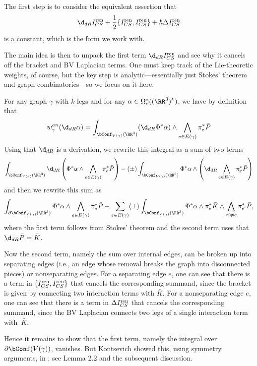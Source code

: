 \documentclass[10pt]{amsart}
\begin{document}
The first step is to consider the equivalent assertion that
\[
\d_{dR} I^{\rm ren}_{CS} + \frac{1}{2} \{I^{\rm ren}_{CS},I^{\rm ren}_{CS}\} + \hbar \Delta I^{\rm ren}_{CS} 
\]
is a constant,
which is the form we work with.

The main idea is then to unpack the first term $\d_{dR} I^{\rm ren}_{CS}$ and see why it cancels off the bracket and BV Laplacian terms.
One must keep track of the Lie-theoretic weights, of course, 
but the key step is analytic---essentially just Stokes' theorem and graph combinatorics---so we focus on it here.

For any graph $\gamma$ with $k$ legs and for any  $\alpha \in \Omega^*_c((\RR^3)^k)$, 
we have by definition that
\[
w^{an}_\gamma(\d_{dR} \alpha) 
= \int_{\bConf_{V(\gamma)}(\RR^3)} (\d_{dR}\Phi^*\alpha) \wedge \bigwedge_{e \in E(\gamma)} \pi_e^* \bar{P}
\]
Using that $\d_{dR}$ is a derivation,
we rewrite this integral as a sum of two terms
\[
\int_{\bConf_{V(\gamma)}(\RR^3)} \d_{dR}\left(\Phi^*\alpha \wedge \bigwedge_{e \in E(\gamma)} \pi_e^* \bar{P}\right) 
- (\pm)\int_{\bConf_{V(\gamma)}(\RR^3)} \Phi^*\alpha \wedge \left(\d_{dR} \bigwedge_{e \in E(\gamma)} \pi_e^* \bar{P}\right)
\]
and then we rewrite this sum as
\begin{equation}
\label{eqn: CS QME expansion}
\int_{\partial\bConf_{V(\gamma)}(\RR^3)} \Phi^*\alpha \wedge \bigwedge_{e \in E(\gamma)} \pi_e^* \bar{P}
- \sum_{e \in E(\gamma)} (\pm) \int_{\bConf_{V(\gamma)}(\RR^3)} \Phi^*\alpha \wedge \pi_e^*\bar{K} \wedge \bigwedge_{e' \neq e} \pi_{e'}^* \bar{P},
\end{equation}
where the first term follows from Stokes' theorem and the second term uses that $\d_{dR} \bar{P} = \bar{K}$.

Now the second term, namely the sum over internal edges, can be broken up into separating edges (i.e., an edge whose removal breaks the graph into disconnected pieces) or nonseparating edges.
For a separating edge $e$, one can see that there is a term in $\{I^{\rm ren}_{CS}, I^{\rm ren}_{CS}\}$
that cancels the corresponding summand, 
since the bracket is given by connecting two interaction terms with $\bar{K}$.
For a nonseparating edge $e$, one can see that there is a term in $\Delta I^{\rm ren}_{CS}$
that cancels the corresponding summand,
since the BV Laplacian connects two legs of a single interaction term with~$\bar{K}$.

Hence it remains to show that the first term, namely the integral over $\partial \bConf(V(\gamma))$, vanishes.
But Kontsevich showed this, using symmetry arguments, in \cite{KonECM};
see Lemma 2.2 and the subsequent discussion.
\end{document}
